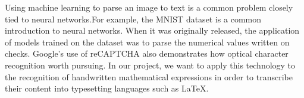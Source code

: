 \documentclass[../proposal.tex]{subfiles}
\begin{document}
Using machine learning to parse an image to text is a common problem closely tied to neural networks.For example, the MNIST dataset is a common introduction to neural networks. \cite*{lecun_2010_MNIST} When it was originally released, the application of models trained on the dataset was to parse the numerical values written on checks. Google's use of reCAPTCHA also demonstrates how optical character recognition worth pursuing. \cite*{Ahn_2008_reCAPTCHA} In our project, we want to apply this technology to the recognition of handwritten mathematical expressions in order to transcribe their content into typesetting languages such as LaTeX.
\end{document}
